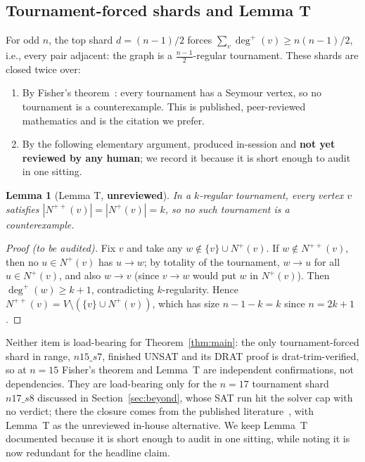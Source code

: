 \documentclass[11pt]{article}
\newtheorem{lemma}{Lemma}
\newcommand{\Nout}{N^{+}}
\newcommand{\Nsec}{N^{++}}
\begin{document}
\subsection{Tournament-forced shards and Lemma T}\label{sec:lemmat}

For odd $n$, the top shard $d = (n-1)/2$ forces
$\sum_v \deg^+(v) \ge n(n-1)/2$, i.e., every pair adjacent: the graph is a
$\frac{n-1}{2}$-regular tournament. These shards are closed twice over:

\begin{enumerate}
\item By Fisher's theorem~\cite{Fisher96}: every tournament has a Seymour
vertex, so no tournament is a counterexample. This is published,
peer-reviewed mathematics and is the citation we prefer.
\item By the following elementary argument, produced in-session and
\textbf{not yet reviewed by any human}; we record it because it is short
enough to audit in one sitting.
\end{enumerate}

\begin{lemma}[Lemma T, \textbf{unreviewed}]\label{lem:t}
In a $k$-regular tournament, every vertex $v$ satisfies
$|\Nsec(v)| = |\Nout(v)| = k$, so no such tournament is a counterexample.
\end{lemma}

\begin{proof}[Proof (to be audited)]
Fix $v$ and take any $w \notin \{v\} \cup \Nout(v)$. If $w \notin
\Nsec(v)$, then no $u \in \Nout(v)$ has $u \to w$; by totality of the
tournament, $w \to u$ for all $u \in \Nout(v)$, and also $w \to v$ (since
$v \to w$ would put $w$ in $\Nout(v)$). Then $\deg^+(w) \ge k + 1$,
contradicting $k$-regularity. Hence $\Nsec(v) = V \setminus (\{v\} \cup
\Nout(v))$, which has size $n - 1 - k = k$ since $n = 2k+1$.
\end{proof}

Neither item is load-bearing for Theorem~\ref{thm:main}: the only
tournament-forced shard in range, $n15\_s7$, finished UNSAT and its DRAT
proof is drat-trim-verified, so at $n = 15$ Fisher's theorem and Lemma~T
are independent confirmations, not dependencies. They are load-bearing
only for the $n = 17$ tournament shard $n17\_s8$ discussed in
Section~\ref{sec:beyond}, whose SAT run hit the solver cap with no
verdict; there the closure comes from the published
literature~\cite{Fisher96}, with Lemma~T as the unreviewed in-house
alternative. We keep Lemma~T documented because it is short enough to
audit in one sitting, while noting it is now redundant for the headline
claim.
\end{document}
